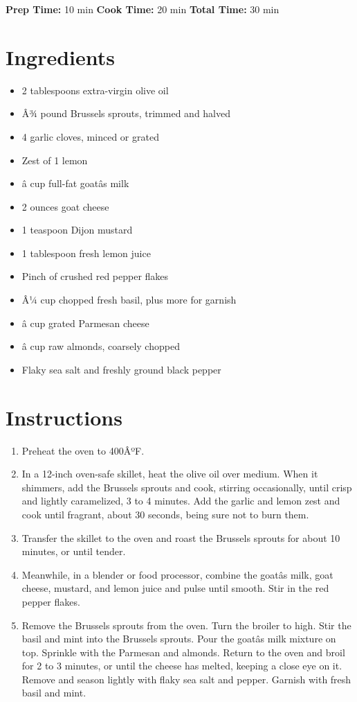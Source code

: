 \documentclass[
  letterpaper,
  DIV=11,
  numbers=noendperiod,
  titlepage=false]{scrreprt}
\providecommand{\tightlist}{%
  \setlength{\itemsep}{0pt}\setlength{\parskip}{0pt}}\usepackage{longtable,booktabs,array}
\begin{document}
\textbf{Prep Time:} 10 min \textbar{} \textbf{Cook Time:} 20 min
\textbar{} \textbf{Total Time:} 30 min

\section{Ingredients}\label{ingredients-40}

\begin{itemize}
\tightlist
\item
  2 tablespoons extra-virgin olive oil
\item
  Â¾ pound Brussels sprouts, trimmed and halved
\item
  4 garlic cloves, minced or grated
\item
  Zest of 1 lemon
\item
  â cup full-fat goatâs milk
\item
  2 ounces goat cheese
\item
  1 teaspoon Dijon mustard
\item
  1 tablespoon fresh lemon juice
\item
  Pinch of crushed red pepper flakes
\item
  Â¼ cup chopped fresh basil, plus more for garnish
\item
  â cup grated Parmesan cheese
\item
  â cup raw almonds, coarsely chopped
\item
  Flaky sea salt and freshly ground black pepper
\end{itemize}

\section{Instructions}\label{instructions-40}

\begin{enumerate}
\def\labelenumi{\arabic{enumi}.}
\tightlist
\item
  Preheat the oven to 400ÂºF.
\item
  In a 12-inch oven-safe skillet, heat the olive oil over medium. When
  it shimmers, add the Brussels sprouts and cook, stirring occasionally,
  until crisp and lightly caramelized, 3 to 4 minutes. Add the garlic
  and lemon zest and cook until fragrant, about 30 seconds, being sure
  not to burn them.
\item
  Transfer the skillet to the oven and roast the Brussels sprouts for
  about 10 minutes, or until tender.
\item
  Meanwhile, in a blender or food processor, combine the goatâs milk,
  goat cheese, mustard, and lemon juice and pulse until smooth. Stir in
  the red pepper flakes.
\item
  Remove the Brussels sprouts from the oven. Turn the broiler to high.
  Stir the basil and mint into the Brussels sprouts. Pour the goatâs
  milk mixture on top. Sprinkle with the Parmesan and almonds. Return to
  the oven and broil for 2 to 3 minutes, or until the cheese has melted,
  keeping a close eye on it. Remove and season lightly with flaky sea
  salt and pepper. Garnish with fresh basil and mint.
\end{enumerate}
\end{document}
